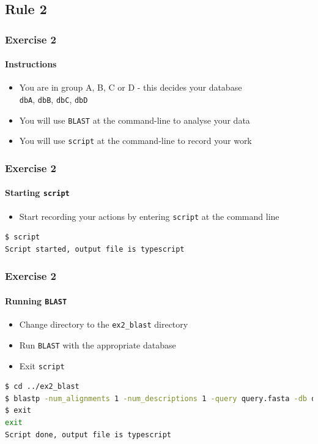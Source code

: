 \documentclass[table]{beamer}
\begin{document}
  \subsection{Rule 2}
  \begin{frame}
    \frametitle{Exercise 2}
    \framesubtitle{Instructions}    
    \begin{itemize}
      \item You are in group A, B, C or D - this decides your database\\
      \texttt{dbA}, \texttt{dbB}, \texttt{dbC}, \texttt{dbD}
      \item You will use \texttt{BLAST} at the command-line to analyse your data
      \item You will use \texttt{script} at the command-line to record your work
    \end{itemize}
  \end{frame}

  \begin{frame}[fragile]
    \frametitle{Exercise 2}
    \framesubtitle{Starting \texttt{script}}    
    \begin{itemize}
      \item Start recording your actions by entering \texttt{script} at the command line      
    \end{itemize}
    \begin{lstlisting}[language=bash]
$ script
Script started, output file is typescript
    \end{lstlisting}    
\end{frame}

  \begin{frame}[fragile]
    \frametitle{Exercise 2}
    \framesubtitle{Running \texttt{BLAST}}
    \begin{itemize}
      \item Change directory to the \texttt{ex2\_blast} directory
      \item Run \texttt{BLAST} with the appropriate database
      \item Exit \texttt{script}
    \end{itemize}
    \begin{lstlisting}[language=bash]
$ cd ../ex2_blast
$ blastp -num_alignments 1 -num_descriptions 1 -query query.fasta -db dbA
$ exit
exit
Script done, output file is typescript
    \end{lstlisting}    
\end{frame}
\end{document}
